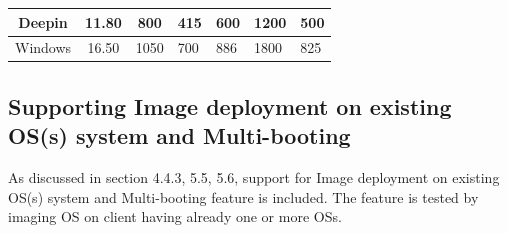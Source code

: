 \documentclass[a4paper,12pt]{article}
\begin{document}
\begin{table}[H]
\begin{tabular}{|c|c|c|l|l|l|l|}
Deepin       & 11.80                                                                 & 800                                                                       & 415                                                                               & 600                                                                         & 1200                                                                             & 500                                                                          \\ \hline
Windows      & 16.50                                                                 & 1050                                                                      & 700                                                                               & 886                                                                         & 1800                                                                             & 825                                                                          \\ \hline
\end{tabular}

\label{imaging}
\end{table}
\subsection{ Supporting Image deployment on existing OS(s) system and Multi-booting }
As discussed in section 4.4.3, 5.5, 5.6, support for Image deployment on existing OS(s) system and Multi-booting feature is included. The feature is tested by imaging OS on client having already one or more OSs.
\end{document}
